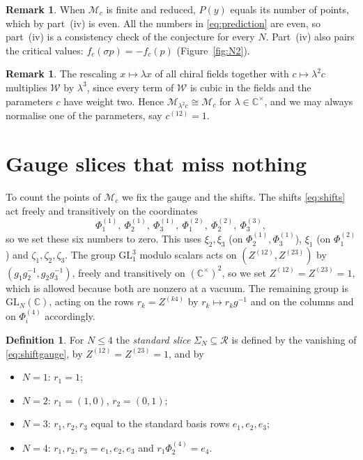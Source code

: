 \documentclass[11pt]{amsart}
\theoremstyle{definition}
\newtheorem{definition}[theorem]{Definition}
\newtheorem{remark}[theorem]{Remark}
\newcommand{\CC}{\mathbb{C}}
\newcommand{\cM}{\mathcal M}
\newcommand{\cR}{\mathcal R}
\newcommand{\cW}{\mathcal W}
\newcommand{\GL}{\mathrm{GL}}
\begin{document}
\begin{remark}
When $\cM_c$ is finite and reduced, $P(y)$ equals its number of points, which by part~(iv) is even. All the numbers in \eqref{eq:prediction} are even, so part~(iv) is a consistency check of the conjecture for every $N$. Part~(iv) also pairs the critical values: $f_c(\sigma p)=-f_c(p)$ (Figure~\ref{fig:N2}).
\end{remark}

\begin{remark}\label{rem:scaling}
The rescaling $x\mapsto\lambda x$ of all chiral fields together with $c\mapsto\lambda^2c$ multiplies $\cW$ by $\lambda^3$, since every term of $\cW$ is cubic in the fields and the parameters $c$ have weight two. Hence $\cM_{\lambda^2c}\cong\cM_c$ for $\lambda\in\CC^\times$, and we may always normalise one of the parameters, say $c^{(12)}=1$.
\end{remark}

\section{Gauge slices that miss nothing}\label{sec:slices}

To count the points of $\cM_c$ we fix the gauge and the shifts. The shifts \eqref{eq:shifts} act freely and transitively on the coordinates
\begin{equation}\label{eq:shiftgauge}
\Phi^{(1)}_1,\ \Phi^{(1)}_2,\ \Phi^{(1)}_3,\ \Phi^{(2)}_1,\ \Phi^{(2)}_2,\ \Phi^{(3)}_3,
\end{equation}
so we set these six numbers to zero. This uses $\xi_2,\xi_3$ (on $\Phi^{(1)}_2,\Phi^{(1)}_3$), $\xi_1$ (on $\Phi^{(2)}_1$) and $\zeta_1,\zeta_2,\zeta_3$. The group $\GL_1^3$ modulo scalars acts on $(Z^{(12)},Z^{(23)})$ by $(g_1g_2^{-1},g_2g_3^{-1})$, freely and transitively on $(\CC^\times)^2$, so we set $Z^{(12)}=Z^{(23)}=1$, which is allowed because both are nonzero at a vacuum. The remaining group is $\GL_N(\CC)$, acting on the rows $r_k=Z^{(k4)}$ by $r_k\mapsto r_kg^{-1}$ and on the columns and on $\Phi^{(4)}_i$ accordingly.

\begin{definition}\label{def:slices}
For $N\le 4$ the \emph{standard slice} $\Sigma_N\subseteq\cR$ is defined by the vanishing of \eqref{eq:shiftgauge}, by $Z^{(12)}=Z^{(23)}=1$, and by
\begin{itemize}
\item $N=1$: $r_1=1$;
\item $N=2$: $r_1=(1,0)$, $r_2=(0,1)$;
\item $N=3$: $r_1,r_2,r_3$ equal to the standard basis rows $e_1,e_2,e_3$;
\item $N=4$: $r_1,r_2,r_3=e_1,e_2,e_3$ and $r_1\Phi^{(4)}_2=e_4$.
\end{itemize}
\end{definition}
\end{document}
